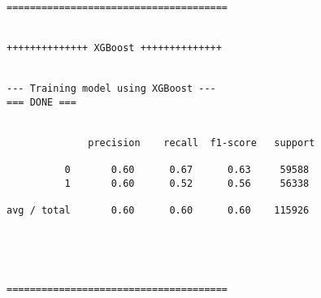 \documentclass[11pt]{article}
\begin{document}
    \begin{Verbatim}[commandchars=\\\{\}]
======================================


++++++++++++++ XGBoost ++++++++++++++


--- Training model using XGBoost ---
=== DONE ===


              precision    recall  f1-score   support

          0       0.60      0.67      0.63     59588
          1       0.60      0.52      0.56     56338

avg / total       0.60      0.60      0.60    115926
 


    \end{Verbatim}

    \begin{center}
    \end{center}
    { \hspace*{\fill} \\}
    
    \begin{Verbatim}[commandchars=\\\{\}]
======================================


    \end{Verbatim}


    
    
    
    
\end{document}
